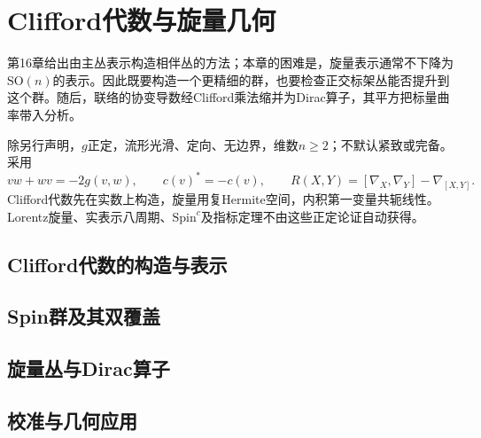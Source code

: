 \chapter{Clifford代数与旋量几何}
\label{ch:19-spin}

第16章给出由主丛表示构造相伴丛的方法；本章的困难是，旋量表示通常不下降为$\mathrm{SO}(n)$的表示。因此既要构造一个更精细的群，也要检查正交标架丛能否提升到这个群。随后，联络的协变导数经Clifford乘法缩并为Dirac算子，其平方把标量曲率带入分析。

除另行声明，$g$正定，流形光滑、定向、无边界，维数$n\geq2$；不默认紧致或完备。采用
\[
 vw+wv=-2g(v,w),\qquad c(v)^*=-c(v),\qquad
 R(X,Y)=[\nabla_X,\nabla_Y]-\nabla_{[X,Y]}.
\]
Clifford代数先在实数上构造，旋量用复Hermite空间，内积第一变量共轭线性。Lorentz旋量、实表示八周期、$\mathrm{Spin}^c$及指标定理不由这些正定论证自动获得。

\section{Clifford代数的构造与表示}



\section{Spin群及其双覆盖}



\section{旋量丛与Dirac算子}



\section{校准与几何应用}



